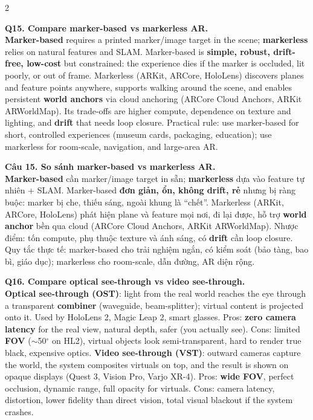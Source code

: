 \begin{paracol}{2}
\switchcolumn*

\textbf{Q15. Compare marker-based vs markerless AR.}\\
\textbf{Marker-based} requires a printed marker/image target in the scene; \textbf{markerless} relies on natural features and SLAM. Marker-based is \textbf{simple, robust, drift-free, low-cost} but constrained: the experience dies if the marker is occluded, lit poorly, or out of frame. Markerless (ARKit, ARCore, HoloLens) discovers planes and feature points anywhere, supports walking around the scene, and enables persistent \textbf{world anchors} via cloud anchoring (ARCore Cloud Anchors, ARKit ARWorldMap). Its trade-offs are higher compute, dependence on texture and lighting, and \textbf{drift} that needs loop closure. Practical rule: use marker-based for short, controlled experiences (museum cards, packaging, education); use markerless for room-scale, navigation, and large-area AR.

\switchcolumn

\textbf{Câu 15. So sánh marker-based vs markerless AR.}\\
\textbf{Marker-based} cần marker/image target in sẵn; \textbf{markerless} dựa vào feature tự nhiên + SLAM. Marker-based \textbf{đơn giản, ổn, không drift, rẻ} nhưng bị ràng buộc: marker bị che, thiếu sáng, ngoài khung là ``chết''. Markerless (ARKit, ARCore, HoloLens) phát hiện plane và feature mọi nơi, đi lại được, hỗ trợ \textbf{world anchor} bền qua cloud (ARCore Cloud Anchors, ARKit ARWorldMap). Nhược điểm: tốn compute, phụ thuộc texture và ánh sáng, có \textbf{drift} cần loop closure. Quy tắc thực tế: marker-based cho trải nghiệm ngắn, có kiểm soát (bảo tàng, bao bì, giáo dục); markerless cho room-scale, dẫn đường, AR diện rộng.

\switchcolumn*

\textbf{Q16. Compare optical see-through vs video see-through.}\\
\textbf{Optical see-through (OST)}: light from the real world reaches the eye through a transparent \textbf{combiner} (waveguide, beam-splitter); virtual content is projected onto it. Used by HoloLens 2, Magic Leap 2, smart glasses. Pros: \textbf{zero camera latency} for the real view, natural depth, safer (you actually see). Cons: limited \textbf{FOV} ($\sim$50$^\circ$ on HL2), virtual objects look semi-transparent, hard to render true black, expensive optics. \textbf{Video see-through (VST)}: outward cameras capture the world, the system composites virtuals on top, and the result is shown on opaque displays (Quest 3, Vision Pro, Varjo XR-4). Pros: \textbf{wide FOV}, perfect occlusion, dynamic range, full opacity for virtuals. Cons: camera latency, distortion, lower fidelity than direct vision, total visual blackout if the system crashes.


\end{paracol}
